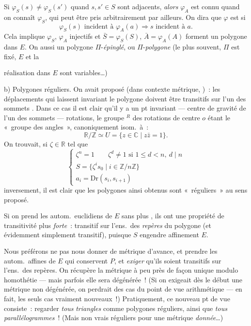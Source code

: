 \documentclass[11pt,a4paper]{article}
\begin{document}
Si $\varphi_S(s) \neq \varphi_S(s')$ quand $s,s' \in S$ sont adjacents, \emph{alors} $\varphi_A$ est connu quand on connaît $\varphi_S$, qui peut être pris arbitrairement par ailleurs. On dira que $\varphi$ est   si
\[
  \varphi_S(s) \text{ incident à } \varphi_A(a) \Longrightarrow s \text{ incident à } a.
\]
Cela implique $\varphi_S$, $\varphi_A$ injectifs et $\bar{S} = \varphi_S(S)$, $\bar{A} = \varphi_A(A)$ forment un  polygone dans $E$. On \struck{\ill{}}  aussi un polygone $\Pi$-\emph{épinglé}, ou $\Pi$-\emph{polygone} (le plus souvent, $\Pi$ est fixé, $E$ et la

réalisation dans $E$ sont variables…)

b) Polygones réguliers. On avait proposé (dans contexte métrique, )~: les déplacements  qui laissent invariant le polygone doivent être transitifs sur l'un des sommets \add{\ill{}}. Dans ce cas il est clair qu'il y a un pt invariant --- centre de gravité de l'un des sommets ---   rotations,  le groupe $^{R}$ des rotations de centre $o$ étant le «~groupe des angles~», canoniquement isom.\ à~:
\[
  \mathbb{R}/\mathbb{Z} \simeq U = \{z \in \mathbb{C} \mid z\bar{z} = 1\}.
\]
On trouvait, si $\zeta \in \mathbb{R}$ tel que
\[
  \begin{cases}
    \zeta^{n} = 1 \qquad \zeta^{d} \neq 1 \text{ si } 1 \leq d < n,\ d \mid n \\
    S = \{\zeta^{i} s_0 \mid i \in \mathbb{Z}/n\mathbb{Z}\} \\
    a_i = \mathrm{Dr}(s_i, s_{i+1})
  \end{cases}
\]
inversement, il est clair que les polygones ainsi obtenus sont «~réguliers~» au sens proposé.

Si on prend les autom.\ euclidiens de $E$ sans plus , ils ont une propriété  de transitivité plus \emph{forte}~:   transitif sur l'ens.\ des \emph{repères} du polygone (et évidemment simplement transitif), puisque $S$ engendre affinement $E$.

Nous préférons ne pas nous donner de métrique d'avance, et prendre les autom.\ affines de $E$ qui conservent $P$, et \emph{exiger} qu'ils soient transitifs sur l'ens.\ des repères. On récupère la métrique à peu près de façon unique modulo homothétie --- mais parfois elle sera dégénérée~! (Si on exigeait dès le début une métrique non dégénérée, on perdrait des cas \struck{\ill{}}  du point de vue arithmétique --- en fait, les seuls cas vraiment nouveaux~!) Pratiquement, ce nouveau pt de vue consiste~: regarder \emph{tous} \emph{triangles} comme polygones réguliers, ainsi que \emph{tous} \emph{parallélogrammes}~! (Mais non vrais réguliers pour une métrique \emph{donnée}…)
\end{document}
